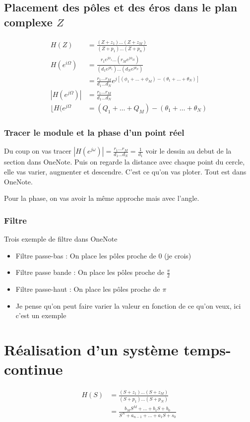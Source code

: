 \documentclass{article}
\theoremstyle{plain}%
\theoremstyle{definition}
\theoremstyle{remark}
\begin{document}
\subsection{Placement des pôles et des éros dans le plan complexe $ Z $ }
\begin{align*}
    H(Z) &= \frac{(Z + z_1)\dots(Z + z_M)}{(Z + p_1)\dots(Z + p_n)} \\
    H(e^{i \Omega }) &= \frac{r_1 e^{j \phi _1} \dots (r_M e^{j \phi _M})}{(d_1 e^{j \theta _1})\dots(d_N e^{j \theta _N})} \\
        &= \frac{r_1\dots r_M}{d_1 \dots d_N}e^{j[(\phi _1 + \dots + \phi _M) - (\theta _1 + \dots + \theta _N)]} \\
    \left| H(e^{j \Omega}) \right| &= \frac{r_1\dots r_M}{d_1 \dots d_N} \\ 
    \lfloor H(e^{j \Omega } &= (Q_1+\dots+Q_M)-( \theta _1 + \dots + \theta _N)
\end{align*}

\subsubsection{Tracer le module et la phase d'un point réel}
Du coup on vas tracer $ \left| H(e^{j \omega }) \right| = \frac{r_1 \dots r_M}{d_1 \dots d_N} = \frac{1}{d_1}  $ voir le dessin au debut de la section dans OneNote.
Puis on regarde la distance avec chaque point du cercle, elle vas varier, augmenter et descendre. C'est ce qu'on vas ploter. Tout est dans OneNote.

Pour la phase, on vas avoir la même approche mais avec l'angle.

\subsubsection{Filtre}
Trois exemple de filtre dans OneNote
\begin{itemize}
    \item Filtre passe-bas : On place les pôles proche de $ 0 $ (je crois)
    \item Filtre passe bande : On place les pôles proche de $ \frac{\pi }{2} $ 
    \item Filtre passe-haut : On place les pôles proche de $ \pi  $ 
    \item Je pense qu'on peut faire varier la valeur en fonction de ce qu'on veux, ici c'est un exemple
\end{itemize}

\section{Réalisation d'un système temps-continue}
\begin{align*}
    H(S) &= \frac{(S + z_1) \dots (S + z_M)}{(S + p_1) \dots (S+p_N)} \\
        &= \frac{b_M S^M + \dots + b_1 S + b_0}{S^N + a_{n-1} + \dots + a_1S + s_0}
\end{align*}
\end{document}
